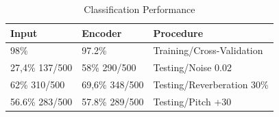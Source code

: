 \documentclass[11pt,a4paper]{article}
\begin{document}
\begin{table}[]
\centering
\caption{Classification Performance}
\label{classification_performances}
\begin{tabular}{|l|l|l|}
\hline
Input          & Encoder        & Procedure                  \\ \hline
98\%           & 97.2\%         & Training/Cross-Validation  \\ \hline
27,4\% 137/500 & 58\% 290/500   & Testing/Noise 0.02         \\ \hline
62\% 310/500   & 69,6\% 348/500 & Testing/Reverberation 30\% \\ \hline
56.6\% 283/500 & 57.8\% 289/500 & Testing/Pitch +30          \\ \hline
\end{tabular}
\end{table}

\printglossaries



\end{document}
